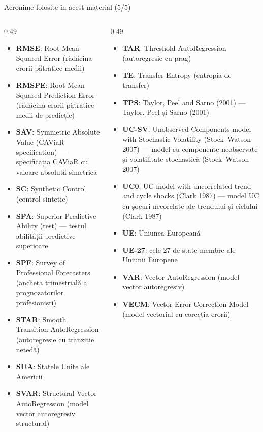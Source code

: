 \begin{frame}{Acronime folosite în acest material (5/5)}
\begin{columns}[T]
\begin{column}{0.49\textwidth}
\begin{itemize}\setlength{\itemsep}{0pt}
    \item \textbf{RMSE}: Root Mean Squared Error (rădăcina erorii pătratice medii)
    \item \textbf{RMSPE}: Root Mean Squared Prediction Error (rădăcina erorii pătratice medii de predicție)
    \item \textbf{SAV}: Symmetric Absolute Value (CAViaR specification) — specificația CAViaR cu valoare absolută simetrică
    \item \textbf{SC}: Synthetic Control (control sintetic)
    \item \textbf{SPA}: Superior Predictive Ability (test) — testul abilității predictive superioare
    \item \textbf{SPF}: Survey of Professional Forecasters (ancheta trimestrială a prognozatorilor profesioniști)
    \item \textbf{STAR}: Smooth Transition AutoRegression (autoregresie cu tranziție netedă)
    \item \textbf{SUA}: Statele Unite ale Americii
    \item \textbf{SVAR}: Structural Vector AutoRegression (model vector autoregresiv structural)
\end{itemize}
\end{column}
\begin{column}{0.49\textwidth}
\begin{itemize}\setlength{\itemsep}{0pt}
    \item \textbf{TAR}: Threshold AutoRegression (autoregresie cu prag)
    \item \textbf{TE}: Transfer Entropy (entropia de transfer)
    \item \textbf{TPS}: Taylor, Peel and Sarno (2001) — Taylor, Peel și Sarno (2001)
    \item \textbf{UC-SV}: Unobserved Components model with Stochastic Volatility (Stock–Watson 2007) — model cu componente neobservate și volatilitate stochastică (Stock–Watson 2007)
    \item \textbf{UC0}: UC model with uncorrelated trend and cycle shocks (Clark 1987) — model UC cu șocuri necorelate ale trendului și ciclului (Clark 1987)
    \item \textbf{UE}: Uniunea Europeană
    \item \textbf{UE-27}: cele 27 de state membre ale Uniunii Europene
    \item \textbf{VAR}: Vector AutoRegression (model vector autoregresiv)
    \item \textbf{VECM}: Vector Error Correction Model (model vectorial cu corecția erorii)
\end{itemize}
\end{column}
\end{columns}
\end{frame}

